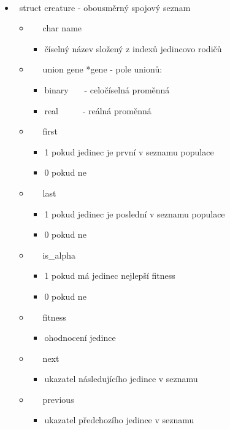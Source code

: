 \documentclass{article}
\begin{document}
 \ \ \ 
\begin{itemize}
\item  \ struct creature - obousměrný spojový seznam
\begin{itemize}
\item  \ \ \ char name \ \ \ \ \ \ \ 
\begin{itemize}
\item číselný název složený z indexů jedincovo rodičů
\end{itemize}
\item  \ \ \ union gene *gene - pole unionů: 
\begin{itemize}
\item binary \ \ \ - celočíselná proměnná
\item real \ \ \ \ \ - reálná proměnná
\end{itemize}
\item  \ \ \ first \ \ \ \ \ \ 
\begin{itemize}
\item 1 pokud jedinec je první v seznamu populace
\item 0 pokud ne
\end{itemize}
\item  \ \ \ last \ \ \ \ \ \ \ 
\begin{itemize}
\item 1 pokud jedinec je poslední v seznamu populace
\item 0 pokud ne
\end{itemize}
\item  \ \ \ is\_alpha \ \ 
\begin{itemize}
\item 1 pokud má jedinec nejlepší fitness
\item 0 pokud ne
\end{itemize}
\item  \ \ \ fitness \ \ \ \ 
\begin{itemize}
\item ohodnocení jedince
\end{itemize}
\item  \ \ \ next \ \ \ \ \ \ \ 
\begin{itemize}
\item ukazatel následujícího jedince v seznamu
\end{itemize}
\item  \ \ \ previous \ \ \ 
\begin{itemize}
\item ukazatel předchozího jedince v seznamu
\end{itemize}
\end{itemize}
\end{itemize}
\end{document}
